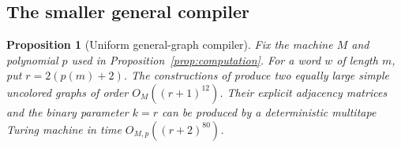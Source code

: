 \documentclass[11pt]{article}
\newtheorem{proposition}[theorem]{Proposition}
\theoremstyle{definition}
\begin{document}
\subsection{The smaller general compiler}

\begin{proposition}[Uniform general-graph compiler]\label{prop:uniform-general}
Fix the machine $M$ and polynomial $p$ used in
Proposition~\ref{prop:computation}. For a word $w$ of length $m$, put
$r=2(p(m)+2)$. The constructions of
produce two equally large simple uncolored
graphs of order $O_M((r+1)^{12})$. Their explicit adjacency matrices and the
binary parameter $k=r$ can be produced by a deterministic multitape Turing
machine in time $O_{M,p}((r+2)^{80})$.
\end{proposition}
\end{document}
